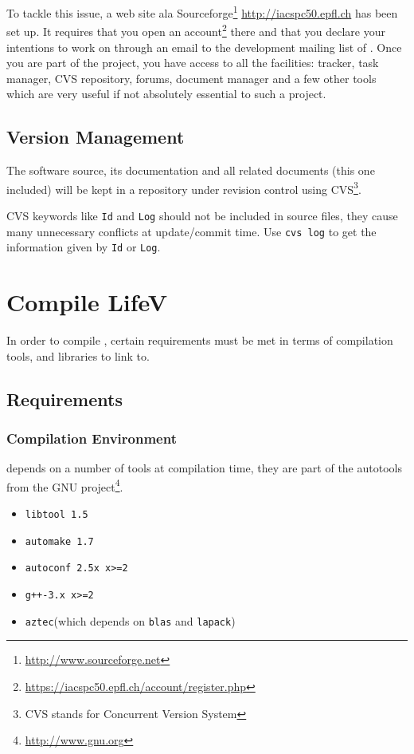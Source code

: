To tackle this issue, a web site ala Sourceforge\footnote{\url{http://www.sourceforge.net}} \url{http://iacspc50.epfl.ch} has been set up. It requires that you open an account\footnote{\url{https://iacspc50.epfl.ch/account/register.php}} there and that you declare your intentions to work on \lifev through an email to the development mailing list of \lifev. Once you are part of the project, you have access to all the facilities: tracker, task manager, CVS repository, forums, document manager and a few other tools which are very useful if not absolutely essential to such a project.


\subsection{Version Management}
\label{sec:some-conventions}

The software source, its documentation and all related documents (this
one included) will be kept in a repository under revision control
using CVS\footnote{CVS stands for Concurrent Version System}.  

CVS keywords like \verb!Id! and \verb!Log! should not be included in source files,
they cause many unnecessary conflicts at update/commit time. Use 
\verb!cvs log! to get the information given by \verb!Id! or \verb!Log!.

\section{Compile LifeV}
\label{compile-lifev} 

In order to compile \lifev, certain requirements must be met in terms of compilation tools, and libraries to link to.

\subsection{Requirements}

\subsubsection{Compilation Environment}

\lifev depends on a number of tools at compilation time, they are part of the autotools from the GNU project\footnote{\url{http://www.gnu.org}}.

\begin{itemize}
\item \verb!libtool 1.5!
\item \verb!automake 1.7!
\item \verb!autoconf 2.5x x>=2!
\item \verb!g++-3.x x>=2!
\item \verb!aztec!(which depends on \verb!blas! and \verb!lapack!)
\end{itemize} 

